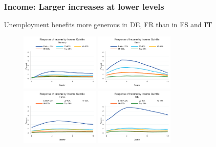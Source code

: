 \documentclass[pdflatex,aspectratio=169]{beamer}
\begin{document}
\begin{frame}\frametitle{\bf Income: Larger increases at lower levels}
Unemployment benefits more generous in DE, FR than in ES and \textbf{IT}
\begin{figure}
\begin{center}
\includegraphics[width=0.35\textwidth]{./figures/di2000_chart_DE}
\includegraphics[width=0.35\textwidth]{./figures/di2000_chart_ES}\\
\includegraphics[width=0.35\textwidth]{./figures/di2000_chart_FR}
\includegraphics[width=0.35\textwidth]{./figures/di2000_chart_IT}
\end{center}
\end{figure}

\end{frame}
\end{document}
